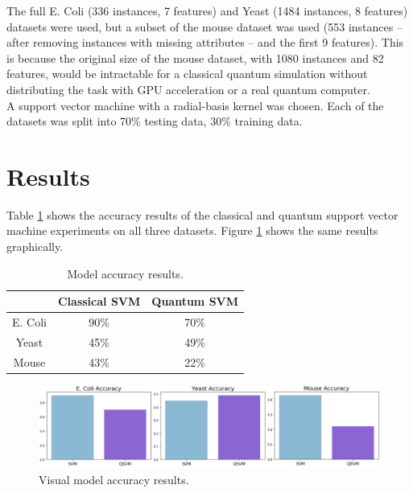 \documentclass{article}
\begin{document}
  The full E. Coli (336 instances, 7 features) and Yeast (1484 instances, 8 features) datasets were used, but a subset of the mouse dataset was used (553 instances -- after removing instances with missing attributes -- and the first 9 features). This is because the original size of the mouse dataset, with 1080 instances and 82 features, would be intractable for a classical quantum simulation without distributing the task with GPU acceleration or a real quantum computer. \\

  A support vector machine with a radial-basis kernel was chosen. Each of the datasets was split into 70\% testing data, 30\% training data. \\

\section{Results}
  Table \ref{table:accuracy} shows the accuracy results of the classical and quantum support vector machine experiments on all three datasets. Figure \ref{fig:results} shows the same results graphically. \\

  \begin{table}[h]
    \centering
    \begin{tabular}{c|c|c|}
    \cline{2-3}
                                  & Classical SVM & Quantum SVM \\ \hline
    \multicolumn{1}{|c|}{E. Coli} & 90\%          & 70\%        \\ \hline
    \multicolumn{1}{|c|}{Yeast}   & 45\%          & 49\%        \\ \hline
    \multicolumn{1}{|c|}{Mouse}   & 43\%          & 22\%        \\ \hline
    \end{tabular}
    \caption{\label{table:accuracy}Model accuracy results.}
  \end{table}

  \hfill \break

  \begin{figure}[h]
    \centering
    \includegraphics[width=1\textwidth]{accuracy.png}
    \caption{\label{fig:results}Visual model accuracy results.}
  \end{figure}
\end{document}
